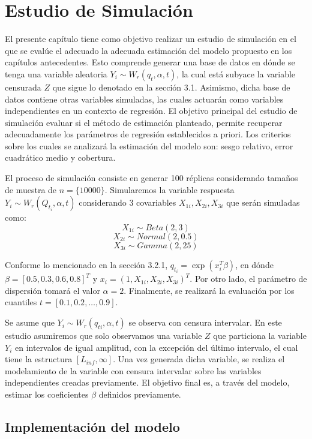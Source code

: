 \chapter{Estudio de Simulación}
El presente capítulo tiene como objetivo realizar un estudio de simulación en el que se evalúe el adecuado la adecuada estimación del modelo propuesto en los capítulos antecedentes. Esto comprende generar una base de datos en dónde se tenga una variable aleatoria $Y_i \sim W_r(q_t, \alpha,t)$, la cual está subyace la variable censurada $Z$ que sigue lo denotado en la sección 3.1. Asimismo, dicha base de datos contiene otras variables simuladas, las cuales actuarán como variables independientes en un contexto de regresión. El objetivo principal del estudio de simulación evaluar si el método de estimación planteado, permite recuperar adecuadamente los parámetros de regresión establecidos a priori. Los criterios sobre los cuales se analizará la estimación del modelo son: sesgo relativo, error cuadrático medio y cobertura.

El proceso de simulación consiste en generar 100 réplicas considerando tamaños de muestra de $n=\{10000\}$. Simularemos la variable respuesta $Y_{i} \sim W_r(Q_{t_{i}},\alpha,t)$ considerando 3 covariables $X_{1i},X_{2i},X_{3i}$ que serán simuladas como:
\[X_{1i} \sim Beta(2,3)\]
\[X_{2i} \sim Normal(2,0.5)\]
\[X_{3i} \sim Gamma(2,25)\]

Conforme lo mencionado en la sección 3.2.1, $q_{t_{i}} =  \exp(x_i^T \beta)$, en dónde $\beta =[0.5, 0.3, 0.6, 0.8]^T$ y $x_{i}=(1,X_{1i},X_{2i},X_{3i})^{T}$. Por otro lado, el parámetro de dispersión tomará el valor $\alpha = 2$. Finalmente, se realizará la evaluación por los cuantiles $t = [0.1, 0.2, \dots, 0.9]$.

Se asume que $Y_i \sim W_r(q_{ti}, \alpha,t)$ se observa con censura intervalar. En este estudio asumiremos que solo observamos una variable $Z$ que particiona la variable $Y_i$ en intervalos de igual amplitud, con la excepción del último intervalo, el cual tiene la estructura $[L_{inf}, \infty]$. Una vez generada dicha variable, se realiza el modelamiento de la variable con censura intervalar sobre las variables independientes creadas previamente. El objetivo final es, a través del modelo, estimar los coeficientes $\beta$ definidos previamente.

\section{Implementación del modelo}

